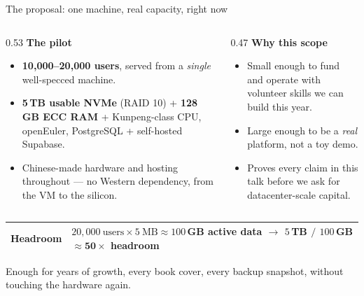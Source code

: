 \documentclass[aspectratio=169,10pt]{beamer}
\newcommand{\eyebrow}[1]{{\small\color{sovGold}\textbf{#1}}}
\begin{document}
\begin{frame}{The proposal: one machine, real capacity, right now}
  \begin{columns}[T]
    \begin{column}{0.53\textwidth}
      \eyebrow{The pilot}
      \begin{itemize}
        \item \textbf{10{,}000--20{,}000 users}, served from a \emph{single} well-specced machine.
        \item \textbf{5\,TB usable NVMe} (RAID 10) + \textbf{128\,GB ECC RAM} + Kunpeng-class CPU, openEuler, PostgreSQL + self-hosted Supabase.
        \item Chinese-made hardware and hosting throughout --- no Western dependency, from the VM to the silicon.
      \end{itemize}
    \end{column}
    \begin{column}{0.47\textwidth}
      \eyebrow{Why this scope}
      \begin{itemize}
        \item Small enough to fund and operate with volunteer skills we can build this year.
        \item Large enough to be a \emph{real} platform, not a toy demo.
        \item Proves every claim in this talk before we ask for datacenter-scale capital.
      \end{itemize}
    \end{column}
  \end{columns}
  \vspace{6pt}
  \small
  \renewcommand{\arraystretch}{1.15}
  \begin{tabularx}{\linewidth}{@{}l>{\raggedright\arraybackslash}X@{}}
    \toprule
    Headroom & $20{,}000~\text{users} \times 5~\text{MB} \approx 100$\,GB active data $\rightarrow$ $5$\,TB $/$ $100$\,GB $\approx \mathbf{50\times}$ headroom \\
    \bottomrule
  \end{tabularx}
  {\scriptsize\color{sovGrey} Enough for years of growth, every book cover, every backup snapshot, without touching the hardware again.}
\end{frame}
\end{document}
